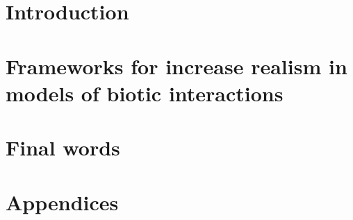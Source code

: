 
\part{Introduction}
\part{Frameworks for increase realism in models of biotic interactions}

\part{Final words}

\cleardoublepage %



\part{Appendices} %











\cleardoublepage %



